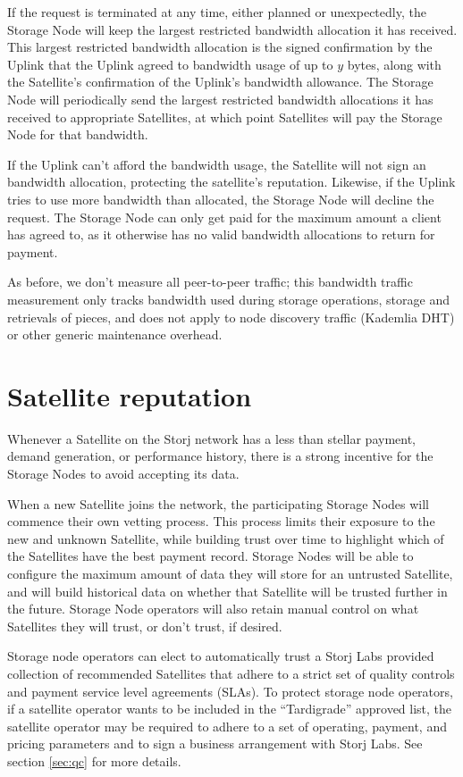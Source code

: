 \documentclass[8pt,fleqn,openany]{book}
\begin{document}
If the request is terminated at any time,
either planned or unexpectedly,
the Storage Node will keep the largest restricted bandwidth allocation it has
received.
This largest restricted bandwidth allocation is the signed confirmation
by the Uplink that the Uplink agreed to bandwidth usage of up to $y$
bytes, along with the Satellite's confirmation of the Uplink's bandwidth
allowance.
The Storage Node will periodically send the largest restricted bandwidth
allocations it has received to appropriate Satellites, at which point
Satellites will pay the Storage Node for that bandwidth.

If the Uplink can't afford the bandwidth usage, the Satellite will not sign an
bandwidth allocation, protecting the satellite's reputation.
Likewise, if the Uplink tries to use more bandwidth than allocated,
the Storage Node will decline the request.
The Storage Node can only get paid for the maximum amount a client has agreed to,
as it otherwise has no valid bandwidth allocations to return for payment.

As before, we don't measure all peer-to-peer traffic;
this bandwidth traffic measurement only tracks
bandwidth used during storage operations, storage and retrievals of pieces,
and does not apply to node discovery traffic (Kademlia DHT) or other generic
maintenance overhead.

\section{Satellite reputation}\label{sec:concrete-satellite-reputation}

Whenever a Satellite on the Storj network has a less than stellar payment,
demand generation, or performance history,
there is a strong incentive for the Storage Nodes to avoid accepting its data.

When a new Satellite joins the network, the participating Storage Nodes will
commence their own vetting process.
This process limits their exposure to the new and unknown
Satellite, while building trust over time to highlight which of the
Satellites have the best payment record.
Storage Nodes will be able to configure the maximum amount of data they will
store for an untrusted Satellite, and will build historical data on whether
that Satellite will be trusted further in the future.
Storage Node operators will also retain manual control on what Satellites they
will trust, or don't trust, if desired.

Storage node operators can elect to automatically trust a Storj Labs
provided collection of recommended Satellites that adhere to a strict set of
quality controls and payment service level agreements (SLAs).
To protect storage node operators, if a satellite operator wants to be
included in the ``Tardigrade'' approved list,
the satellite operator may be required to
adhere to a set of operating, payment, and pricing parameters and to sign a
business arrangement with Storj Labs.
See section \ref{sec:qc} for more details.
\end{document}
